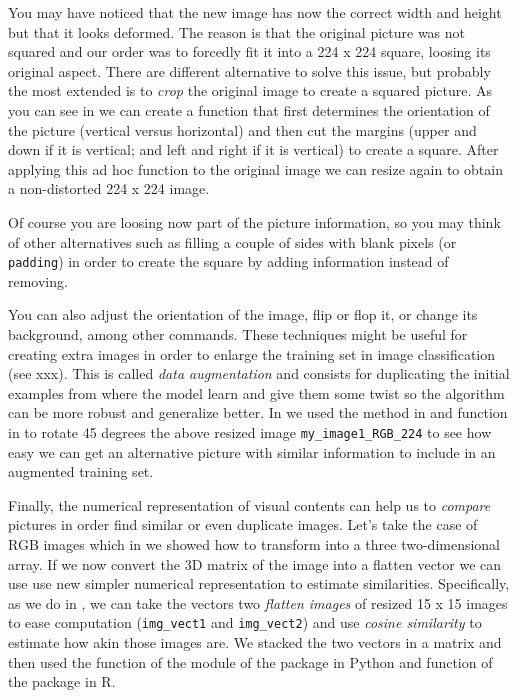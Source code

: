 You may have noticed that the new image has now the correct width and height but that it looks deformed. The reason is that the original picture was not squared and our order was to forcedly fit it into a 224 x 224 square, loosing its original aspect. There are different alternative to solve this issue, but probably the most extended is to \textit{crop} the original image to create a squared picture. As you can see in  we can create a function that first determines the orientation of the picture (vertical versus horizontal) and then cut the margins (upper and down if it is vertical; and left and right if it is vertical) to create a square. After applying this ad hoc function  to the original image we can resize again to obtain a non-distorted 224 x 224 image.

Of course you are loosing now part of the picture information, so you may think of other alternatives such as filling a couple of sides with blank pixels (or \texttt{padding}) in order to create the square by adding information instead of removing.


You can also adjust the orientation of the image, flip or flop it, or change its background, among other commands. These techniques might be useful for creating extra images in order to enlarge the training set in image classification (see xxx). This is called \textit{data augmentation} and consists for duplicating the initial examples from where the model learn and give them some twist so the algorithm can be more robust and generalize better. In  we used the  method in  and  function in  to rotate 45 degrees the above resized image \texttt{my\_image1\_RGB\_224} to see how easy we can get an alternative picture with similar information to include in an augmented training set.


Finally, the numerical representation of visual contents can help us to \textit{compare} pictures in order find similar or even duplicate images. Let's take the case of RGB images which in  we showed how to transform into a three two-dimensional array. If we now convert the 3D matrix of the image into a flatten vector we can use use new simpler numerical representation to estimate similarities. Specifically, as we do in , we can take the vectors two \textit{flatten images} of resized 15 x 15 images to ease computation (\texttt{img\_vect1} and \texttt{img\_vect2}) and use \textit{cosine similarity} to estimate how akin those images are. We stacked the two vectors in a matrix and then used the  function of the  module of the   package in Python and  function of the  package in R.


